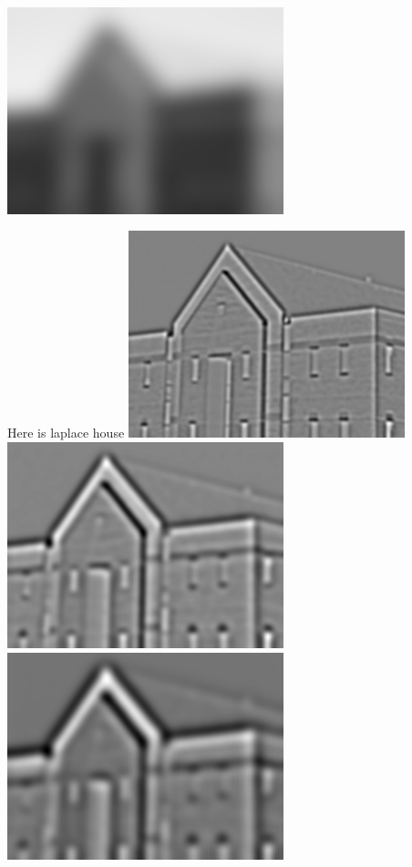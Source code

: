 \documentclass{article}
\begin{document}
\includegraphics[height=60mm]{blurredhouse301}
\newpage

Here is laplace house
\includegraphics[height=60mm]{laplace51}
\includegraphics[height=60mm]{laplace101}
\includegraphics[height=60mm]{laplace151}
\end{document}
